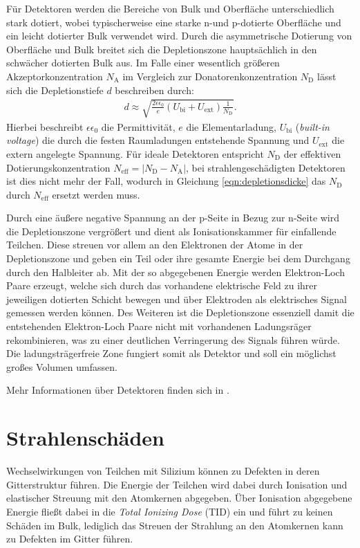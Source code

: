 Für Detektoren werden die Bereiche von Bulk und Oberfläche unterschiedlich stark dotiert, wobei typischerweise eine starke n-und
p-dotierte Oberfläche und ein leicht dotierter Bulk verwendet wird. Durch die asymmetrische
Dotierung von Oberfläche und Bulk breitet sich die Depletionszone hauptsächlich in den schwächer dotierten Bulk aus.
Im Falle einer wesentlich größeren Akzeptorkonzentration $N_{\mathrm{A}}$
im Vergleich zur Donatorenkonzentration $N_{\mathrm{D}}$ lässt sich die Depletionstiefe $d$ beschreiben durch:
\begin{align}
  d \approx \sqrt{\frac{2 \epsilon \epsilon_0}{e} (U_{\mathrm{bi}}+U_{\mathrm{ext}})\frac{1}{N_{\mathrm{D}}}}.
  \label{eqn:depletionsdicke}
\end{align}
Hierbei beschreibt $\epsilon \epsilon_0$ die Permittivität, $e$ die Elementarladung, $U_{\mathrm{bi}}$ (\textit{built-in voltage})  die
durch die festen Raumladungen entstehende Spannung und $U_{\mathrm{ext}}$ die extern angelegte Spannung. Für ideale Detektoren entspricht $N_{\mathrm{D}}$ der effektiven Dotierungskonzentration $N_{\mathrm{eff}}=|N_{\mathrm{D}}-N_{\mathrm{A}}|$, bei
strahlengeschädigten Detektoren ist dies nicht mehr der Fall, wodurch in Gleichung \ref{eqn:depletionsdicke} das $N_{\mathrm{D}}$ durch $N_{\mathrm{eff}}$ ersetzt werden muss.


Durch eine äußere negative Spannung  an der p-Seite in Bezug zur n-Seite wird die Depletionszone vergrößert und dient als Ionisationskammer für einfallende Teilchen. Diese streuen vor allem
an den Elektronen der Atome in der Depletionszone und geben ein Teil oder ihre gesamte Energie bei dem Durchgang durch den Halbleiter ab. Mit der so abgegebenen
Energie werden Elektron-Loch Paare erzeugt, welche sich durch das vorhandene elektrische Feld zu ihrer jeweiligen dotierten
Schicht bewegen und über Elektroden als elektrisches Signal gemessen werden können. Des Weiteren ist die Depletionszone essenziell damit
die entstehenden Elektron-Loch Paare nicht mit vorhandenen Ladungsräger rekombinieren, was zu einer deutlichen Verringerung des Signals führen würde.
Die ladungsträgerfreie Zone fungiert somit als Detektor und soll ein möglichst großes Volumen umfassen.

Mehr Informationen über Detektoren finden sich in  \cite{semiconductor}.

\section{Strahlenschäden}
Wechselwirkungen von Teilchen mit Silizium können zu Defekten in deren
Gitterstruktur führen.
Die Energie der Teilchen wird dabei durch Ionisation und elastischer Streuung mit den Atomkernen abgegeben. Über Ionisation abgegebene Energie
fließt dabei in die
\textit{Total Ionizing Dose} (TID) ein und führt zu keinen Schäden im Bulk, lediglich das Streuen der Strahlung an den
Atomkernen kann zu Defekten im Gitter führen.

